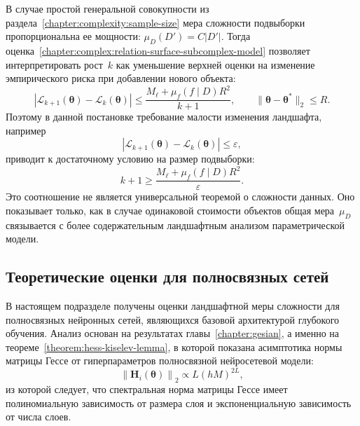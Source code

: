 \begin{remark}\label{chapter:complex:remark-surface-data-complexity}
    В случае простой генеральной совокупности из раздела~\ref{chapter:complexity:sample-size} мера сложности подвыборки пропорциональна ее мощности: $\mu_D(D')=C|D'|$.
    Тогда оценка~\eqref{chapter:complex:relation-surface-subcomplex-model} позволяет интерпретировать рост~$k$ как уменьшение верхней оценки на изменение эмпирического риска при добавлении нового объекта:
    \[
        \left| \mathcal{L}_{k+1}(\boldsymbol{\theta}) - \mathcal{L}_k(\boldsymbol{\theta}) \right|
        \leqslant
        \frac{M_{\ell}+\mu_f(f\mid D)R^2}{k+1},
        \qquad
        \|\boldsymbol{\theta}-\boldsymbol{\theta}^*\|_2\le R.
    \]
    Поэтому в данной постановке требование малости изменения ландшафта, например
    \[
        \left| \mathcal{L}_{k+1}(\boldsymbol{\theta}) - \mathcal{L}_k(\boldsymbol{\theta}) \right| \leq \varepsilon,
    \]
    приводит к достаточному условию на размер подвыборки:
    \[
        k+1 \geq \frac{M_{\ell}+\mu_f(f\mid D)R^2}{\varepsilon}.
    \]
    Это соотношение не является универсальной теоремой о сложности данных. Оно показывает только, как в случае одинаковой стоимости объектов общая мера~$\mu_D$ связывается с более содержательным ландшафтным анализом параметрической модели.
\end{remark}

\subsection{Теоретические оценки для полносвязных сетей}

В настоящем подразделе получены оценки ландшафтной меры сложности для полносвязных нейронных сетей, являющихся базовой архитектурой глубокого обучения. Анализ основан на результатах главы~\ref{chapter:gesian}, а именно на теореме~\ref{theorem:hess-kiselev-lemma}, в которой показана асимптотика нормы матрицы Гессе от гиперпараметров полносвязной нейросетевой модели:
\[
    \left\| \mathbf{H}_i(\boldsymbol{\theta}) \right\|_2 \propto L (hM)^{2L},
\]
из которой следует, что спектральная норма матрицы Гессе имеет полиномиальную зависимость от размера слоя и экспоненциальную зависимость от числа слоев.

